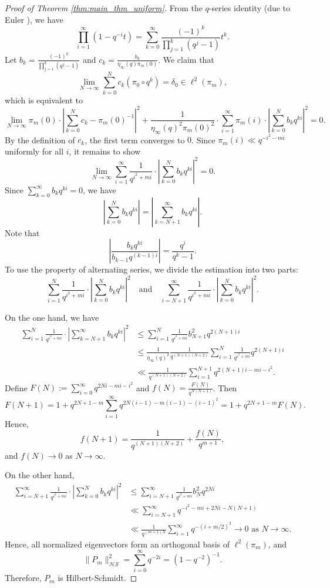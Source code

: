 \documentclass[a4]{amsart}
\newcommand{\HS}{\mathcal{HS}}
\theoremstyle{remark} \newtheorem{remark}[theorem]{Remark}
\begin{document}
\begin{proof}[Proof of Theorem \ref{thm:main_thm_uniform}]
From the $q$-series identity (due to Euler \cite[eq(19)]{gasper2004Basic}), we have
\[
\prod_{i=1}^{\infty} \left(1 - q^{-i} t\right) = \sum_{k=0}^{\infty} \frac{(-1)^k}{\prod_{j=1}^{k} (q^j - 1)} t^k.
\]
Let $b_k = \frac{(-1)^k}{\prod_{j=1}^{k} (q^j - 1)}$ and $c_k = \frac{b_k}{\eta_\infty(q) \pi_m(0)}$. We claim that
\[
\lim_{N \to \infty} \sum_{k=0}^{N} c_k (\pi_0 \circ q^k) = \delta_0 \in \ell^2(\pi_m),
\]
which is equivalent to
\[
\lim_{N \to \infty} \pi_m(0) \cdot \left|\sum_{k=0}^{N} c_k - \pi_m(0)^{-1}\right|^2 + \frac{1}{\eta_\infty(q)^2 \pi_m(0)^2} \cdot \sum_{i=1}^{\infty} \pi_m(i) \cdot \left|\sum_{k=0}^{N} b_k q^{ki}\right|^2 = 0.
\]
By the definition of $c_k$, the first term converges to $0$. Since $\pi_m(i) \ll q^{-i^2 - m i}$ uniformly for all $i$, it remains to show
\[
\lim_{N \to \infty} \sum_{i=1}^{\infty} \frac{1}{q^{i^2 + m i}} \cdot \left|\sum_{k=0}^{N} b_k q^{ki}\right|^2 = 0.
\]
Since $\sum_{k=0}^{\infty} b_k q^{ki} = 0$, we have
\[
\left|\sum_{k=0}^{N} b_k q^{ki}\right| = \left|\sum_{k=N+1}^{\infty} b_k q^{ki}\right|.
\]
Note that
\[
\left|\frac{b_k q^{ki}}{b_{k-1} q^{(k-1)i}}\right| = \frac{q^i}{q^k - 1}.
\]
To use the property of alternating series, we divide the estimation into two parts:
\[
\sum_{i=1}^{N} \frac{1}{q^{i^2 + m i}} \cdot \left|\sum_{k=0}^{N} b_k q^{ki}\right|^2 \quad \text{and} \quad \sum_{i=N+1}^{\infty} \frac{1}{q^{i^2 + m i}} \cdot \left|\sum_{k=0}^{N} b_k q^{ki}\right|^2.
\]

On the one hand, we have
\[
\begin{split}
\sum_{i=1}^{N} \frac{1}{q^{i^2 + m i}} \cdot \left|\sum_{k=N+1}^{\infty} b_k q^{ki}\right|^2 &\leq \sum_{i=1}^{N} \frac{1}{q^{i^2 + m i}} b_{N+1}^2 q^{2(N+1)i} \\
&\leq \frac{1}{\eta_\infty(q)^2} \frac{1}{q^{(N+1)(N+2)}} \sum_{i=1}^{N} \frac{1}{q^{i^2 + m i}} q^{2(N+1)i} \\
&\ll \frac{1}{q^{(N+1)(N+2)}} \sum_{i=1}^{N+1} q^{2(N+1)i - m i - i^2}.
\end{split}
\]
Define $F(N) := \sum_{i=0}^{\infty} q^{2N i - m i - i^2}$ and $f(N) = \frac{F(N)}{q^{N(N+1)}}$. Then
\[
F(N+1) = 1 + q^{2N+1 - m} \sum_{i=1}^{\infty} q^{2N(i-1) - m(i-1) - (i-1)^2} = 1 + q^{2N+1 - m} F(N).
\]
Hence,
\[
f(N+1) = \frac{1}{q^{(N+1)(N+2)}} + \frac{f(N)}{q^{m+1}},
\]
and $f(N) \to 0$ as $N \to \infty$.

On the other hand,
\[
\begin{split}
\sum_{i=N+1}^{\infty} \frac{1}{q^{i^2 + m i}} \cdot \left|\sum_{k=0}^{N} b_k q^{ki}\right|^2 &\leq \sum_{i=N+1}^{\infty} \frac{1}{q^{i^2 + m i}} b_N^2 q^{2N i} \\
&\ll \sum_{i=N+1}^{\infty} q^{-i^2 - m i + 2N i - N(N+1)} \\
&\ll \frac{1}{q^{(m+1)N}} \sum_{i=1}^{\infty} q^{-(i + m/2)^2} \to 0 \text{ as } N \to \infty.
\end{split}
\]
Hence, all normalized eigenvectors form an orthogonal basis of $\ell^2(\pi_m)$, and
\[
\|P_m\|_{\HS}^2 = \sum_{i=0}^{\infty} q^{-2i} = (1 - q^{-2})^{-1}.
\]
Therefore, $P_m$ is Hilbert-Schmidt.
\end{proof}
\end{document}
